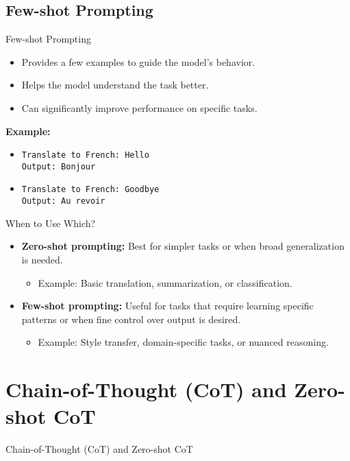 \subsection{Few-shot Prompting}
\begin{frame}{Few-shot Prompting}
    \begin{itemize}
        \setlength{\itemsep}{1em}
        \item Provides a few examples to guide the model's behavior.
        \item Helps the model understand the task better.
        \item Can significantly improve performance on specific tasks.
    \end{itemize}
    \vspace{1em}
    \textbf{Example:}
    \begin{itemize}
        \item \texttt{Translate to French: Hello\\ Output: Bonjour}
        \item \texttt{Translate to French: Goodbye\\ Output: Au revoir}
    \end{itemize}
\end{frame}


\begin{frame}{When to Use Which?}
    \begin{itemize}
        \setlength{\itemsep}{1em}
        \item \textbf{Zero-shot prompting:} Best for simpler tasks or when broad generalization is needed.
        \begin{itemize}
            \item Example: Basic translation, summarization, or classification.
        \end{itemize}
        \item \textbf{Few-shot prompting:} Useful for tasks that require learning specific patterns or when fine control over output is desired.
        \begin{itemize}
            \item Example: Style transfer, domain-specific tasks, or nuanced reasoning.
        \end{itemize}
    \end{itemize}
\end{frame}


\section{Chain-of-Thought (CoT) and Zero-shot CoT}
\begin{frame}{}
    \LARGE Chain-of-Thought (CoT) and Zero-shot CoT
\end{frame}


